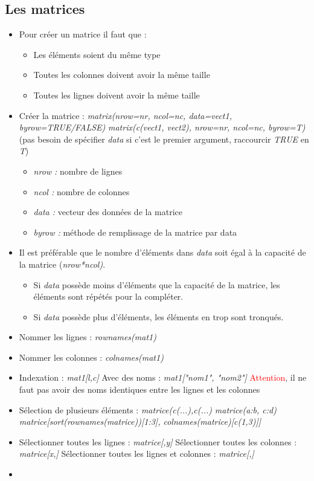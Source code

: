 \documentclass[12pt,a4paper]{article}
\begin{document}
\subsection{Les matrices}
\begin{itemize}
\item Pour créer un matrice il faut que :
\begin{itemize}
\item Les éléments soient du même type
\item Toutes les colonnes doivent avoir la même taille
\item Toutes les lignes doivent avoir la même taille
\end{itemize}
\item Créer la matrice :
\newline \textit{matrix(nrow=nr, ncol=nc, data=vect1, byrow=TRUE/FALSE)}
\newline \textit{matrix(c(vect1, vect2), nrow=nr, ncol=nc, byrow=T)} (pas besoin de spécifier \textit{data} si c'est le premier argument, raccourcir \textit{TRUE} en \textit{T})
\begin{itemize}
\item \textit{nrow : } nombre de lignes
\item \textit{ncol : } nombre de colonnes
\item \textit{data : } vecteur des données de la matrice
\item \textit{byrow : } méthode de remplissage de la matrice par data
\end{itemize}
\item Il est préférable que le nombre d'éléments dans \textit{data} soit égal à la capacité de la matrice (\textit{nrow*ncol)}.
\begin{itemize}
\item Si \textit{data} possède moins d'éléments que la capacité de la matrice, les éléments sont répétés pour la compléter.
\item Si \textit{data} possède plus d'éléments, les éléments en trop sont tronqués.
\end{itemize}
\item Nommer les lignes : \textit{rownames(mat1)}
\item Nommer les colonnes : \textit{colnames(mat1)}
\item Indexation : \textit{mat1[l,c]}
\newline Avec des noms : \textit{mat1["nom1", "nom2"]}
\newline \textcolor{red}{Attention}, il ne faut pas avoir des noms identiques entre les lignes et les colonnes
\item Sélection de plusieurs éléments : \textit{matrice(c(...),c(...)}
\newline \textit{matrice(a:b, c:d)}
\newline \textit{matrice[sort(rownames(matrice))[1:3], colnames(matrice)[c(1,3)]]}
\item Sélectionner toutes les lignes : \textit{matrice[,y]}
\newline Sélectionner toutes les colonnes : \textit{matrice[x,]}
\newline Sélectionner toutes les lignes et colonnes : \textit{matrice[,]}
\item
\end{itemize}
\end{document}
